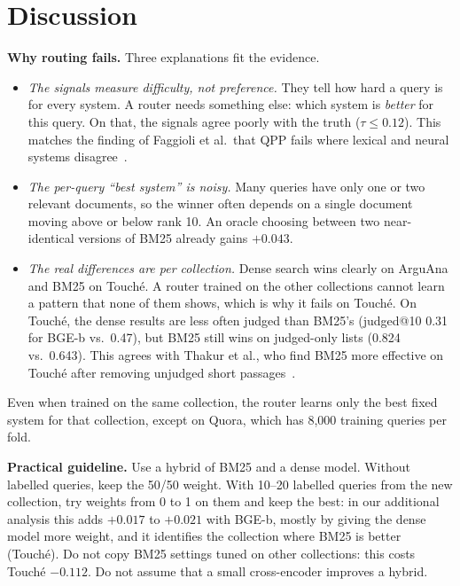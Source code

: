 \documentclass[conference]{IEEEtran}
\begin{document}
\section{Discussion}
\label{sec:discussion}
\textbf{Why routing fails.} Three explanations fit the evidence.
\begin{itemize}
\item \emph{The signals measure difficulty, not preference.} They tell how hard a query is for every system. A router needs something else: which system is \emph{better} for this query. On that, the signals agree poorly with the truth ($\tau\leq0.12$). This matches the finding of Faggioli et al.\ that QPP fails where lexical and neural systems disagree~\cite{faggioli2023qpp}.
\item \emph{The per-query ``best system'' is noisy.} Many queries have only one or two relevant documents, so the winner often depends on a single document moving above or below rank 10. An oracle choosing between two near-identical versions of BM25 already gains $+0.043$.
\item \emph{The real differences are per collection.} Dense search wins clearly on ArguAna and BM25 on Touch\'e. A router trained on the other collections cannot learn a pattern that none of them shows, which is why it fails on Touch\'e. On Touch\'e, the dense results are less often judged than BM25's (judged@10 0.31 for BGE-b vs.\ 0.47), but BM25 still wins on judged-only lists (0.824 vs.\ 0.643). This agrees with Thakur et al., who find BM25 more effective on Touch\'e after removing unjudged short passages~\cite{thakur2024touche}.
\end{itemize}
Even when trained on the same collection, the router learns only the best fixed system for that collection, except on Quora, which has 8,000 training queries per fold.

\textbf{Practical guideline.} Use a hybrid of BM25 and a dense model. Without labelled queries, keep the 50/50 weight. With 10--20 labelled queries from the new collection, try weights from 0 to 1 on them and keep the best: in our additional analysis this adds $+0.017$ to $+0.021$ with BGE-b, mostly by giving the dense model more weight, and it identifies the collection where BM25 is better (Touch\'e). Do not copy BM25 settings tuned on other collections: this costs Touch\'e $-0.112$. Do not assume that a small cross-encoder improves a hybrid.
\end{document}
